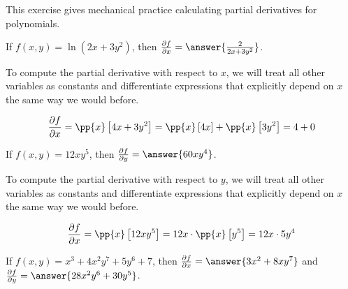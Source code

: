 \documentclass{ximera}
\author{Jim Talamo}
\newcommand{\Pp}[2]{\frac{\partial #1}{\partial #2}}
\begin{document}
This exercise gives mechanical practice calculating partial derivatives for polynomials.
\begin{exercise}


If $f(x,y) = \ln(2x+3y^2)$, then $\Pp{f}{x} = \answer{\frac{2}{2x+3y^2}}$.

\begin{hint}
To compute the partial derivative with respect to $x$, we will treat all other variables as constants and differentiate expressions that explicitly depend on $x$ the same way we would before.

\[
\Pp{f}{x} = \pp{x}\left[ 4x+3y^2 \right] =\pp{x}\left[ 4x \right] +\pp{x}\left[ 3y^2 \right] = 4 + 0
\]
\end{hint}

\end{exercise}


\begin{exercise}
If $f(x,y) = 12xy^5$, then $\Pp{f}{y} = \answer{60xy^4}$.

\begin{hint}
To compute the partial derivative with respect to $y$, we will treat all other variables as constants and differentiate expressions that explicitly depend on $x$ the same way we would before.

\[
\Pp{f}{x} = \pp{x}\left[ 12xy^5 \right] =12x \cdot \pp{x}\left[ y^5 \right] = 12x \cdot 5y^4
\]
\end{hint}

\end{exercise}


\begin{exercise}
If $f(x,y) = x^3+4x^2y^7+5y^6+7$, then $\Pp{f}{x} = \answer{3x^2+8xy^7}$ and $\Pp{f}{y} = \answer{28x^2y^6+30y^5}$.
\end{exercise}
\end{document}

